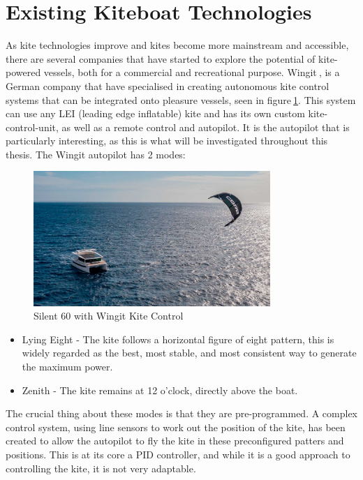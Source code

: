 \section{Existing Kiteboat Technologies}\label{sec:kiteboat_tech}
As kite technologies improve and kites become more mainstream and accessible, there are several companies that have started to explore the potential of kite-powered vessels, both for a commercial and recreational purpose. Wingit$~$\cite{wingit}, is a German company that have specialised in creating autonomous kite control systems that can be integrated onto pleasure vessels, seen in figure$~$\ref{kiteboat}. This system can use any LEI (leading edge inflatable) kite and has its own custom kite-control-unit, as well as a remote control and autopilot. It is the autopilot that is particularly interesting, as this is what will be investigated throughout this thesis. The Wingit autopilot has 2 modes:
\begin{figure}[!htb]
    \centering
    \includegraphics[width=0.8\textwidth]{Images/kiteboat.jpg}
    \caption{Silent 60 with Wingit Kite Control}\label{kiteboat}
\end{figure}
\begin{itemize}
    \item Lying Eight - The kite follows a horizontal figure of eight pattern, this is widely regarded as the best, most stable, and most consistent way to generate the maximum power.
    \item Zenith - The kite remains at 12 o'clock, directly above the boat.
\end{itemize}
The crucial thing about these modes is that they are pre-programmed. A complex control system, using line sensors to work out the position of the kite, has been created to allow the autopilot to fly the kite in these preconfigured patters and positions. This is at its core a PID controller, and while it is a good approach to controlling the kite, it is not very adaptable. 

